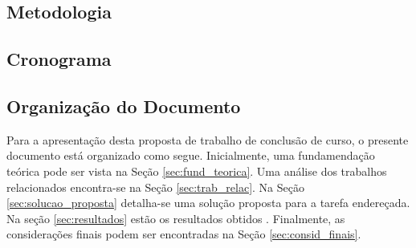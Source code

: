 \subsection{Metodologia}\label{sec:metodo}


\subsection{Cronograma}\label{sec:crono}


\subsection{Organização do Documento}
Para a apresentação desta proposta de trabalho de conclusão de curso, o presente documento está organizado como segue. Inicialmente, uma fundamendação teórica pode ser vista na Seção \ref{sec:fund_teorica}. Uma análise dos trabalhos relacionados encontra-se na Seção \ref{sec:trab_relac}. Na Seção \ref{sec:solucao_proposta} detalha-se uma solução proposta para a tarefa endereçada. Na seção \ref{sec:resultados} estão os resultados obtidos . Finalmente, as considerações finais podem ser encontradas na Seção \ref{sec:consid_finais}.
